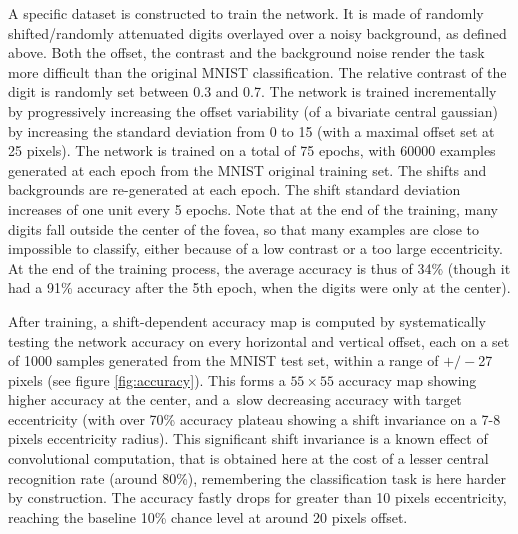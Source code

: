 A specific dataset is constructed to train the network. It is made of  randomly shifted/randomly attenuated digits overlayed over a noisy background, as defined above. Both the offset, the contrast and the background noise render the task more difficult than the original MNIST classification. The relative contrast of the digit is randomly set between 0.3 and 0.7.  The network is trained incrementally by progressively increasing the offset variability (of a bivariate central gaussian) by increasing the standard deviation from 0 to 15 (with a maximal offset set at 25 pixels). The network is trained on a total of 75 epochs, with 60000 examples generated at each epoch from the MNIST original training set. The shifts and backgrounds are re-generated at each epoch. The shift standard deviation increases of one unit every 5 epochs.  Note that at the end of the training, many digits fall outside the center of the fovea, so that many examples are close to impossible to classify, either because of a low contrast or a too large eccentricity. At the end of the training process, the average accuracy is thus of 34\% (though it had a 91\% accuracy after the 5th epoch, when the digits were only at the center). 

After training, a shift-dependent accuracy map is computed by systematically testing the network accuracy on every horizontal and vertical offset, each on a set of 1000 samples generated from the MNIST test set, within a range of $+/-$27 pixels (see figure \ref{fig:accuracy}).  This forms a $55\times 55$ accuracy map showing higher accuracy at the center, and a slow decreasing accuracy with target eccentricity (with over 70\% accuracy plateau showing a shift invariance on a 7-8 pixels eccentricity radius). This significant shift invariance is a known effect of convolutional computation, that is obtained here at the cost of a lesser central recognition rate (around 80\%), remembering the classification task is here harder by construction. The accuracy fastly drops for greater than 10 pixels eccentricity, reaching the baseline 10\% chance level at around 20 pixels offset. 




